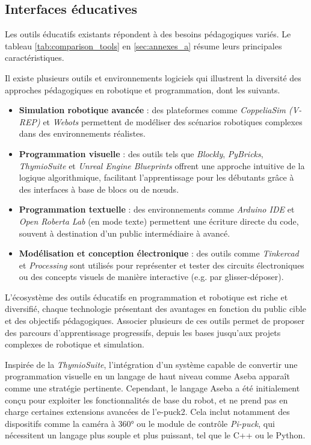 \subsection{Interfaces éducatives} \label{sec:interfaces_éducatives}

Les outils éducatifs existants répondent à des besoins pédagogiques variés.
Le tableau \ref{tab:comparison_tools} en \autoref{sec:annexes_a} résume leurs principales caractéristiques.

Il existe plusieurs outils et environnements logiciels qui illustrent la diversité des approches pédagogiques en robotique et programmation, dont les suivants.

\begin{itemize}
    \item \textbf{Simulation robotique avancée} : des plateformes comme \textit{CoppeliaSim (V-REP)} et \textit{Webots} permettent de modéliser des scénarios robotiques complexes dans des environnements réalistes.
    
    \item \textbf{Programmation visuelle} : des outils tels que \textit{Blockly}, \textit{PyBricks}, \textit{ThymioSuite} et \textit{Unreal Engine Blueprints} offrent une approche intuitive de la logique algorithmique, facilitant l’apprentissage pour les débutants grâce à des interfaces à base de blocs ou de nœuds.

    \item \textbf{Programmation textuelle} : des environnements comme \textit{Arduino IDE} et \textit{Open Roberta Lab} (en mode texte) permettent une écriture directe du code, souvent à destination d’un public intermédiaire à avancé.

    \item \textbf{Modélisation et conception électronique} : des outils comme \textit{Tinkercad} et \textit{Processing} sont utilisés pour représenter et tester des circuits électroniques ou des concepts visuels de manière interactive (e.g. par glisser-déposer).
\end{itemize}

L'écosystème des outils éducatifs en programmation et robotique est riche et diversifié, chaque technologie présentant des avantages en fonction du public cible et des objectifs pédagogiques.
Associer plusieurs de ces outils permet de proposer des parcours d’apprentissage progressifs, depuis les bases jusqu’aux projets complexes de robotique et simulation.

Inspirée de la \textit{ThymioSuite}, l’intégration d’un système capable de convertir une programmation visuelle en un langage de haut niveau comme Aseba apparaît comme une stratégie pertinente.
Cependant, le langage Aseba a été initialement conçu pour exploiter les fonctionnalités de base du robot, et ne prend pas en charge certaines extensions avancées de l’e-puck2. 
Cela inclut notamment des dispositifs comme la caméra à 360° ou le module de contrôle \textit{Pi-puck}, qui nécessitent un langage plus souple et plus puissant, tel que le C++ ou le Python.

